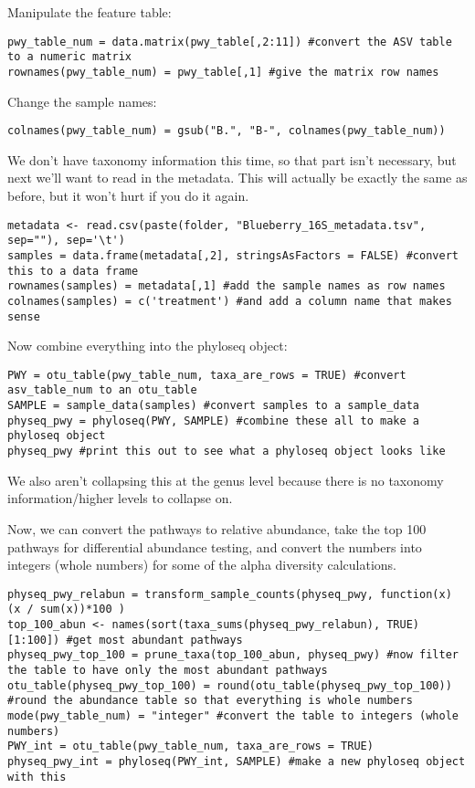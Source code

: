 \documentclass[
]{book}
\begin{document}
Manipulate the feature table:

\begin{verbatim}
pwy_table_num = data.matrix(pwy_table[,2:11]) #convert the ASV table to a numeric matrix
rownames(pwy_table_num) = pwy_table[,1] #give the matrix row names
\end{verbatim}

Change the sample names:

\begin{verbatim}
colnames(pwy_table_num) = gsub("B.", "B-", colnames(pwy_table_num))
\end{verbatim}

We don't have taxonomy information this time, so that part isn't necessary, but next we'll want to read in the metadata. This will actually be exactly the same as before, but it won't hurt if you do it again.

\begin{verbatim}
metadata <- read.csv(paste(folder, "Blueberry_16S_metadata.tsv", sep=""), sep='\t')
samples = data.frame(metadata[,2], stringsAsFactors = FALSE) #convert this to a data frame
rownames(samples) = metadata[,1] #add the sample names as row names
colnames(samples) = c('treatment') #and add a column name that makes sense
\end{verbatim}

Now combine everything into the phyloseq object:

\begin{verbatim}
PWY = otu_table(pwy_table_num, taxa_are_rows = TRUE) #convert asv_table_num to an otu_table
SAMPLE = sample_data(samples) #convert samples to a sample_data
physeq_pwy = phyloseq(PWY, SAMPLE) #combine these all to make a phyloseq object
physeq_pwy #print this out to see what a phyloseq object looks like
\end{verbatim}

We also aren't collapsing this at the genus level because there is no taxonomy information/higher levels to collapse on.

Now, we can convert the pathways to relative abundance, take the top 100 pathways for differential abundance testing, and convert the numbers into integers (whole numbers) for some of the alpha diversity calculations.

\begin{verbatim}
physeq_pwy_relabun = transform_sample_counts(physeq_pwy, function(x) (x / sum(x))*100 )
top_100_abun <- names(sort(taxa_sums(physeq_pwy_relabun), TRUE)[1:100]) #get most abundant pathways
physeq_pwy_top_100 = prune_taxa(top_100_abun, physeq_pwy) #now filter the table to have only the most abundant pathways
otu_table(physeq_pwy_top_100) = round(otu_table(physeq_pwy_top_100)) #round the abundance table so that everything is whole numbers
mode(pwy_table_num) = "integer" #convert the table to integers (whole numbers)
PWY_int = otu_table(pwy_table_num, taxa_are_rows = TRUE)
physeq_pwy_int = phyloseq(PWY_int, SAMPLE) #make a new phyloseq object with this
\end{verbatim}
\end{document}
